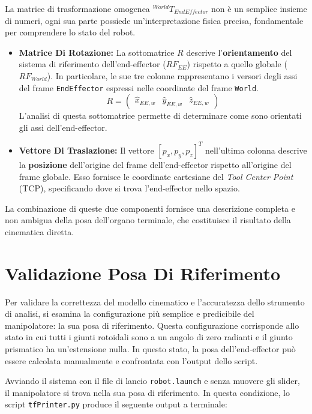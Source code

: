 \documentclass[11pt, a4paper]{report}
\begin{document}
\newpage
La matrice di trasformazione omogenea \(^{World}T_{EndEffector}\) non è un semplice insieme di numeri, ogni sua parte possiede un'interpretazione fisica precisa, fondamentale per comprendere lo stato del robot.
\begin{itemize}
    \item \textbf{Matrice Di Rotazione:} La sottomatrice \(R\) descrive l'\textbf{orientamento} del sistema di riferimento dell'end-effector (\(RF_{EE}\)) rispetto a quello globale (\(RF_{World}\)). In particolare, le sue tre colonne rappresentano i versori degli assi del frame \texttt{EndEffector} espressi nelle coordinate del frame \texttt{World}.
    \[
        R = \begin{pmatrix} \hat{x}_{EE,w} & \hat{y}_{EE,w} & \hat{z}_{EE,w} \end{pmatrix}
    \]
    L'analisi di questa sottomatrice permette di determinare come sono orientati gli assi dell'end-effector.

    \item \textbf{Vettore Di Traslazione:} Il vettore \([p_x, p_y, p_z]^T\) nell'ultima colonna descrive la \textbf{posizione} dell'origine del frame dell'end-effector rispetto all'origine del frame globale. Esso fornisce le coordinate cartesiane del \textit{Tool Center Point} (TCP), specificando dove si trova l'end-effector nello spazio.
\end{itemize}
La combinazione di queste due componenti fornisce una descrizione completa e non ambigua della posa dell'organo terminale, che costituisce il risultato della cinematica diretta.

\section{Validazione Posa Di Riferimento}
\label{sec:validazione_posa}
Per validare la correttezza del modello cinematico e l'accuratezza dello strumento di analisi, si esamina la configurazione più semplice e predicibile del manipolatore: la sua posa di riferimento. Questa configurazione corrisponde allo stato in cui tutti i giunti rotoidali sono a un angolo di zero radianti e il giunto prismatico ha un'estensione nulla. In questo stato, la posa dell'end-effector può essere calcolata manualmente e confrontata con l'output dello script.

Avviando il sistema con il file di lancio \texttt{robot.launch} e senza muovere gli slider, il manipolatore si trova nella sua posa di riferimento. In questa condizione, lo script \texttt{tfPrinter.py} produce il seguente output a terminale:
\end{document}

